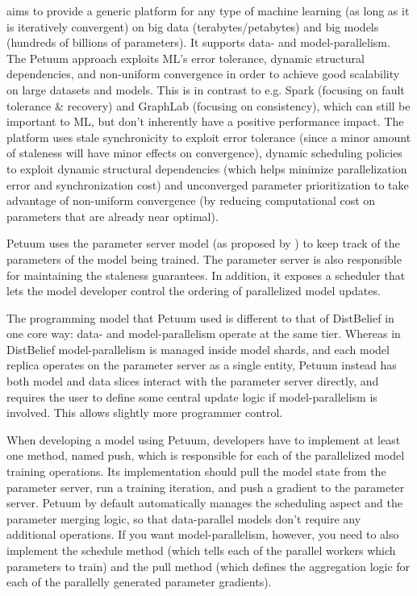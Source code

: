 aims to provide a generic platform for any type of machine learning (as long as it is iteratively convergent) on big data (terabytes/petabytes) and big models (hundreds of billions of parameters). It supports data- and model-parallelism. The Petuum approach exploits ML’s error tolerance, dynamic structural dependencies, and non-uniform convergence in order to achieve good scalability on large datasets and models. This is in contrast to e.g. Spark (focusing on fault tolerance \& recovery) and GraphLab (focusing on consistency), which can still be important to ML, but don't inherently have a positive performance impact. The platform uses stale synchronicity to exploit error tolerance (since a minor amount of staleness will have minor effects on convergence), dynamic scheduling policies to exploit dynamic structural dependencies (which helps minimize parallelization error and synchronization cost) and unconverged parameter prioritization to take advantage of non-uniform convergence (by reducing computational cost on parameters that are already near optimal). 

Petuum uses the parameter server model (as proposed by \citet{DistBelief2012}) to keep track of the parameters of the model being trained. The parameter server is also responsible for maintaining the staleness guarantees. In addition, it exposes a scheduler that lets the model developer control the ordering of parallelized model updates.

The programming model that Petuum used is different to that of DistBelief in one core way: data- and model-parallelism operate at the same tier. Whereas in DistBelief model-parallelism is managed inside model shards, and each model replica operates on the parameter server as a single entity, Petuum instead has both model and data slices interact with the parameter server directly, and requires the user to define some central update logic if model-parallelism is involved. This allows slightly more programmer control.

When developing a model using Petuum, developers have to implement at least one method, named push, which is responsible for each of the parallelized model training operations. Its implementation should pull the model state from the parameter server, run a training iteration, and push a gradient to the parameter server. Petuum by default automatically manages the scheduling aspect and the parameter merging logic, so that data-parallel models don’t require any additional operations. If you want model-parallelism, however, you need to also implement the schedule method (which tells each of the parallel workers which parameters to train) and the pull method (which defines the aggregation logic for each of the parallelly generated parameter gradients).

